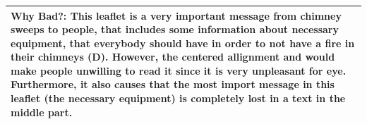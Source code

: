 \documentclass[a4paper,11pt,oneside]{scrreprt}
\begin{document}
\begin{tabularx}{\textwidth}{|X|}
	\\
	\textbf{Why Bad?:} This leaflet is a very important message from chimney sweeps to people, that includes some information about necessary equipment, that everybody should have in order to not have a fire in their chimneys (D). However, the centered allignment and would make people unwilling to read it since it is very unpleasant for eye. Furthermore, it also causes that the most import message in this leaflet (the necessary equipment) is completely lost in a text in the middle part.
	
	\\
	\hline	
	
\end{tabularx}\\

\clearpage




\end{document}
